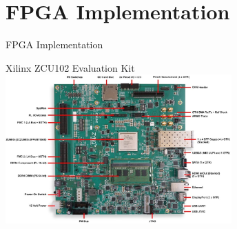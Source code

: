 \setlength{\parskip}{\baselineskip}
\section{FPGA Implementation}

\begin{frame}
    \huge FPGA Implementation
\end{frame}

\begin{frame}{Xilinx ZCU102 Evaluation Kit}
	\centering
	\includegraphics[width=0.65\textwidth]{../Images/Hardware/ZCU102-board-overview.jpg}\\
\end{frame}

